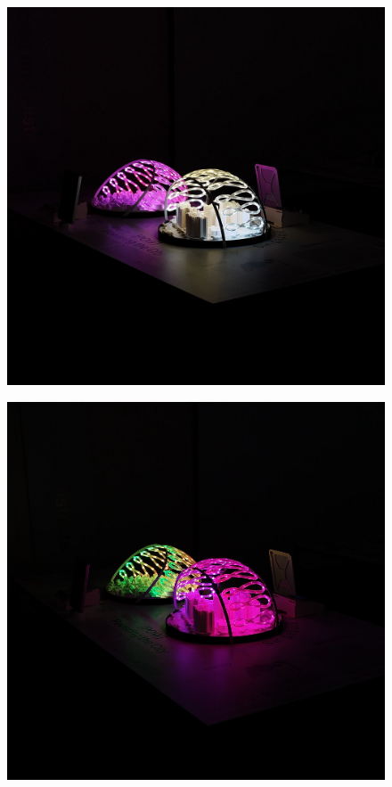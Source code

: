 \documentclass[a4paper,9pt]{article}
\begin{document}
\begin{minipage}{0.48\linewidth}
         \begin{figure}[H]
        \centering
        \includegraphics[width=\linewidth]{Images/d1.jpg}
     
    
    \end{figure}
    \end{minipage}
    \hfill
    \begin{minipage}{0.48\linewidth}
         \begin{figure}[H]
        \centering
        \includegraphics[width=\linewidth]{Images/d2.jpg}
   

    \end{figure}
\end{minipage}
\end{document}
